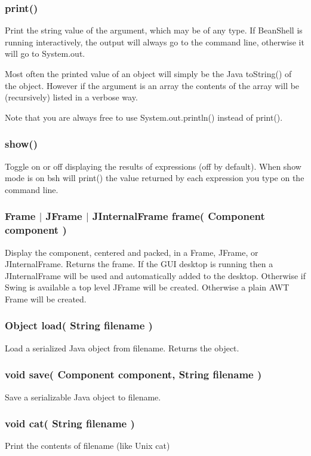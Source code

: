 \documentclass[twoside,11pt]{article}
\renewcommand{\_}{\texttt{\symbol{95}}}
\begin{document}
\subsubsection*{print()}
Print the string value of the argument, which may be of any type.
If BeanShell is running interactively, the output will always go to the
command line, otherwise it will go to System.out.

Most often the printed value of an object will simply be the Java
toString() of the object.  However if the argument is an array the contents
of the array will be (recursively) listed in a verbose way.

Note that you are always free to use System.out.println() instead of print().

\subsubsection*{show()}
Toggle on or off displaying the results of expressions (off by default).
When show mode is on bsh will print() the value returned by each expression
you type on the command line.

\subsubsection*{Frame $|$ JFrame $|$ JInternalFrame frame( Component component )}
Display the component, centered and packed, in a Frame, JFrame, or
JInternalFrame.  Returns the frame.  If the GUI desktop is running then a
JInternalFrame will be used and automatically added to the desktop.  Otherwise
if Swing is available a top level JFrame will be created.  Otherwise a plain
AWT Frame will be created.

\subsubsection*{Object load( String filename )}
Load a serialized Java object from filename.  Returns the object.

\subsubsection*{void save( Component component, String filename )}
Save a serializable Java object to filename.

\subsubsection*{void cat( String filename )}
Print the contents of filename (like Unix cat)
\end{document}
